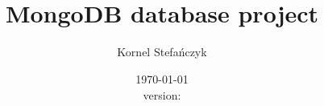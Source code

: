


\title{\\ \large{MongoDB database project}}
\author{Kornel Stefańczyk}
\date{\today\\version: }



\maketitle






